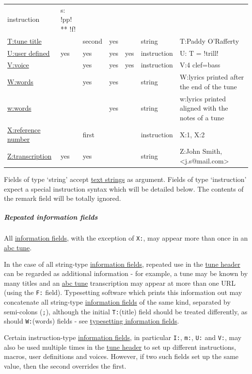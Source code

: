 \documentclass[oneside]{book}
\let\oldsubparagraph\subparagraph
\renewcommand{\subparagraph}[1]{\oldsubparagraph{#1}\mbox{}}
\begin{document}
\begin{longtable}[]{@{}lllllll@{}}
instruction & s: !pp! ** !f!\tabularnewline
\protect\hyperlink{ttune_title}{T:tune title} & & second & yes & &
string & T:Paddy O'Rafferty\tabularnewline
\protect\hyperlink{redefinable_symbols}{U:user defined} & yes & yes &
yes & yes & instruction & U: T = !trill!\tabularnewline
\protect\hyperlink{multiple_voices}{V:voice} & & yes & yes & yes &
instruction & V:4 clef=bass\tabularnewline
\protect\hyperlink{lyrics}{W:words} & & yes & yes & & string & W:lyrics
printed after the end of the tune\tabularnewline
\protect\hyperlink{lyrics}{w:words} & & & yes & & string & w:lyrics
printed aligned with the notes of a tune\tabularnewline
\protect\hyperlink{xreference_number}{X:reference number} & & first & &
& instruction & X:1, X:2\tabularnewline
\protect\hyperlink{ztranscription}{Z:transcription} & yes & yes & & &
string & Z:John Smith,
\textless{}j.s@mail.com\textgreater{}\tabularnewline
\bottomrule
\end{longtable}

Fields of type `string' accept
\protect\hyperlink{text_string_definition}{text strings} as argument.
Fields of type `instruction' expect a special instruction syntax which
will be detailed below. The contents of the remark field will be totally
ignored.

\subparagraph{Repeated information
fields}\label{repeated_information_fields}

All \protect\hyperlink{information_field_definition}{information
fields}, with the exception of \texttt{X:}, may appear more than once in
an \protect\hyperlink{abc_tune_definition}{abc tune}.

In the case of all string-type
\protect\hyperlink{information_field_definition}{information fields},
repeated use in the \protect\hyperlink{tune_header_definition}{tune
header} can be regarded as additional information - for example, a tune
may be known by many titles and an
\protect\hyperlink{abc_tune_definition}{abc tune} transcription may
appear at more than one URL (using the \texttt{F:} field). Typesetting
software which prints this information out may concatenate all
string-type \protect\hyperlink{information_field_definition}{information
fields} of the same kind, separated by semi-colons (\texttt{;}),
although the initial \texttt{T:}(title) field should be treated
differently, as should \texttt{W:}(words) fields - see
\protect\hyperlink{typesetting_information_fields}{typesetting
information fields}.

Certain instruction-type
\protect\hyperlink{information_field_definition}{information fields}, in
particular \texttt{I:}, \texttt{m:}, \texttt{U:} and \texttt{V:}, may
also be used multiple times in the
\protect\hyperlink{tune_header_definition}{tune header} to set up
different instructions, macros, user definitions and voices. However, if
two such fields set up the same value, then the second overrides the
first.
\end{document}

